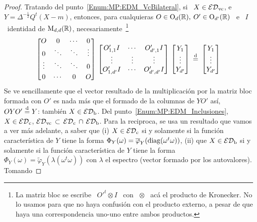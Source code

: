 \begin{proof}
  Tratando del punto~\ref{Enum:MP:EDM_VcBilateral}, si  \ $X \in \mathcal{ED}_{\mathrm{vc}}$, e \
  $Y  =  \Delta^{-\frac12}  Q^t   (X-m)$,  entonces,  para  cualquieras  $O  \in
  \mathrm{O}_d(\mathbb{R}),  \:  O'  \in  \mathrm{O}_{d'}(\mathbb{R})$  \  e  \  $I$  \  identidad  de
  $\mathrm{M}_{d,d}(\mathbb{R})$, necesariamente~\footnote{La matriz  bloc se escribe \ $O'^t
    \otimes I$ \ con \ $\otimes$ \  ac\'a el producto de Kronecker. No lo usamos
    para que  no haya confusi\'on con el  producto externo, a pesar  de que haya
    una correspondencia uno-uno entre ambos productos.}
  \[
  \begin{bmatrix} O & 0 & \cdots & 0 \\ 0 & \ddots & \ddots & \vdots \\ \vdots &
    \ddots  &  \ddots  & \vspace{1mm}  0\\  0  &  \cdots  & 0  &  O\end{bmatrix}
  \,  \begin{bmatrix} O'_{1,1}  I &  \cdots &  O'_{d',1} I\\  \vdots &  \vdots &
    \vdots\\   O'_{1,d'}    I   &   \cdots   &    O'_{d',d'}   I   \end{bmatrix}
  \, \begin{bmatrix}
    Y_1\\ \vdots\\ Y_{d'} \end{bmatrix} \: \egald \: \begin{bmatrix} Y_1\\ \vdots\\
    Y_{d'} \end{bmatrix}
  \]
  Se  ve sencillamente que  el vector  resultado de  la multiplicaci\'on  por la
  matriz bloc formada con $O'$ es nada m\'as que el formado de la columnas de $Y
  O'$   as\'i,  $O  Y   O'  \stackrel{\mathrm{d}}{=}   Y$:  tambi\'en   $X  \in   \mathcal{ED}_{\mathrm{b}}$.   Del
  punto~\ref{Enum:MP:EDM_Inclusiones},  $X  \in  \mathcal{ED}_{\mathrm{c}}$,  \ie  $\mathcal{ED}_{\mathrm{vc}}  \,
  \subset  \, \mathcal{ED}_{\mathrm{c}}  \, \cap  \,  \mathcal{ED}_{\mathrm{b}}$.  Para  la reciproca,  se usa  un
  resultado que vamos a ver m\'as adelante,  a saber que (i) $X \in \mathcal{ED}_{\mathrm{c}}$ si
  y  solamente  si   la  funci\'on  caracter\'istica  de  $Y$   tiene  la  forma
  $\Phi_Y(\omega) =  \overline{\varphi}_Y( \operatorname{diag}( \omega^t \omega)  )$, (ii) que
  $X \in \mathcal{ED}_{\mathrm{b}}$ si y solamente  si la funci\'on caracter\'istica de $Y$ tiene
  la forma  $\Phi_Y(\omega) = \widetilde{\varphi}_Y(\lambda(  \omega^t \omega))$
  con  $\lambda$ el  espectro  (vector formado  por  los autovalores).   Tomando

\end{proof}
